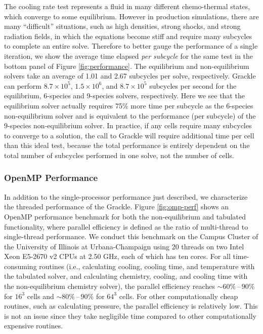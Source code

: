 The cooling rate test represents a fluid in many different
chemo-thermal states, which converge to some equilibrium.  However in
production simulations, there are many ``difficult'' situations, such
as high densities, strong shocks, and strong radiation fields, in
which the equations become stiff and require many subcycles to
complete an entire solve.  Therefore to better gauge the performance
of a single iteration, we show the average time elapsed {\it per
  subcycle} for the same test in the bottom panel of Figure
\ref{fig:performance}.  The equilibrium and non-equilibrium solvers
take an average of 1.01 and 2.67 subcycles per solve, respectively.
Grackle can perform $8.7 \times 10^5$, $1.5 \times 10^6$, and $8.7
\times 10^5$ subcycles per second for the equilibrium, 6-species and
9-species solvers, respectively.  Here we see that the equilibrium
solver actually requires 75\% more time per subcycle as the 6-species
non-equilibrium solver and is equivalent to the performance (per
subcycle) of the 9-species non-equilibrium solver.  In practice, if
any cells require many subcycles to converge to a solution, the call
to Grackle will require additional time per cell than this ideal test,
because the total performance is entirely dependent on the total
number of subcycles performed in one solve, not the number of cells.

\subsubsection{OpenMP Performance}

In addition to the single-processor performance just described, we
characterize the threaded performance of the Grackle.
Figure \ref{fig:omp-perf} shows an OpenMP performance benchmark for both the
non-equilibrium and tabulated functionality, where parallel efficiency is
defined as the ratio of multi-thread to single-thread performance. We
conduct this benchmark on the Campus Cluster of the University of Illinois
at Urbana-Champaign using 20 threads on two Intel Xeon E5-2670 v2 CPUs
at 2.50 GHz, each of which has ten cores. For all time-consuming routines
(i.e., calculating cooling, cooling time, and temperature with the tabulated
solver, and calculating chemistry, cooling, and cooling time with the
non-equilibrium chemistry solver), the parallel efficiency reaches
$\sim 60\%\,\text{--}\,90\%$ for $16^3$ cells and
$\sim 80\%\,\text{--}\,90\%$ for $64^3$ cells. For other computationally cheap
routines, such as calculating pressure, the parallel efficiency is relatively
low. This is not an issue since they take negligible time compared to other
computationally expensive routines.

